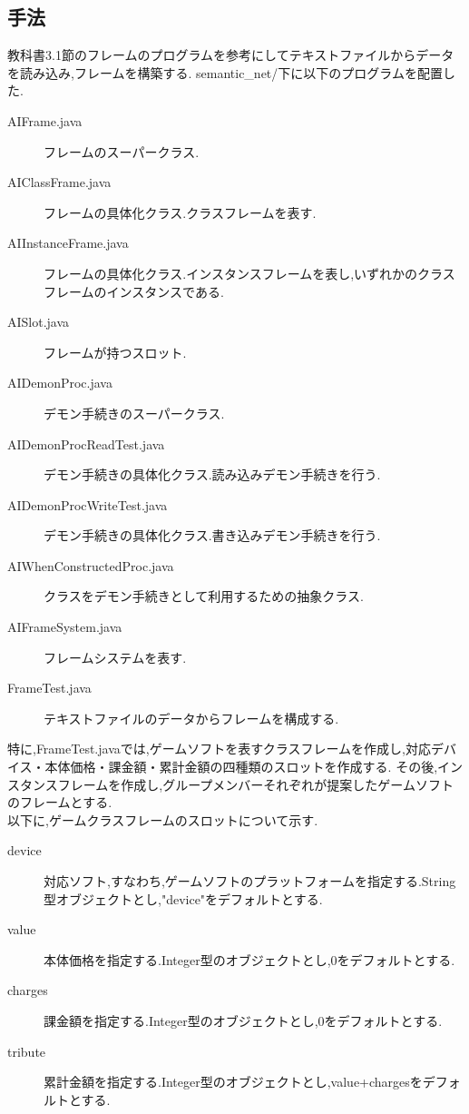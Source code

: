 \documentclass[uplatex,12pt]{jsarticle}
\begin{document}
\subsection{手法}
教科書3.1節のフレームのプログラムを参考にしてテキストファイルからデータを読み込み,フレームを構築する.
semantic\_net/下に以下のプログラムを配置した.
\begin{description}
    \item[AIFrame.java] フレームのスーパークラス.
    \item[AIClassFrame.java] フレームの具体化クラス.クラスフレームを表す. 
    \item[AIInstanceFrame.java] フレームの具体化クラス.インスタンスフレームを表し,いずれかのクラスフレームのインスタンスである. 
    \item[AISlot.java] フレームが持つスロット. 
    \item[AIDemonProc.java] デモン手続きのスーパークラス.
    \item[AIDemonProcReadTest.java] デモン手続きの具体化クラス.読み込みデモン手続きを行う.
    \item[AIDemonProcWriteTest.java] デモン手続きの具体化クラス.書き込みデモン手続きを行う.
    \item[AIWhenConstructedProc.java] クラスをデモン手続きとして利用するための抽象クラス. 
    \item[AIFrameSystem.java] フレームシステムを表す.
    \item[FrameTest.java] テキストファイルのデータからフレームを構成する.  
\end{description}
特に,FrameTest.javaでは,ゲームソフトを表すクラスフレームを作成し,対応デバイス・本体価格・課金額・累計金額の四種類のスロットを作成する.
その後,インスタンスフレームを作成し,グループメンバーそれぞれが提案したゲームソフトのフレームとする. \\
以下に,ゲームクラスフレームのスロットについて示す.
\begin{description}
    \item[device] 対応ソフト,すなわち,ゲームソフトのプラットフォームを指定する.String型オブジェクトとし,"device"をデフォルトとする.
    \item[value] 本体価格を指定する.Integer型のオブジェクトとし,0をデフォルトとする.
    \item[charges] 課金額を指定する.Integer型のオブジェクトとし,0をデフォルトとする.
    \item[tribute] 累計金額を指定する.Integer型のオブジェクトとし,value+chargesをデフォルトとする.
\end{description}
\end{document}

